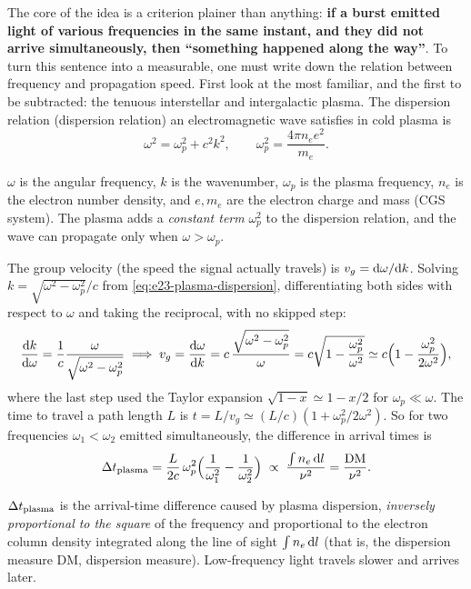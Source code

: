 The core of the idea is a criterion plainer than anything: \textbf{if a burst emitted light of various frequencies in the same instant, and they did not arrive simultaneously, then ``something happened along the way''}. To turn this sentence into a measurable, one must write down the relation between frequency and propagation speed. First look at the most familiar, and the first to be subtracted: the tenuous interstellar and intergalactic plasma. The dispersion relation (dispersion relation) an electromagnetic wave satisfies in cold plasma is
\begin{equation}
  \omega^2=\omega_p^2+c^2k^2,
  \qquad
  \omega_p^2=\frac{4\pi n_e e^2}{m_e}.
  \label{eq:e23-plasma-dispersion}
\end{equation}
\begin{formulaexplain}
\(\omega\) is the angular frequency, \(k\) is the wavenumber, \(\omega_p\) is the plasma frequency, \(n_e\) is the electron number density, and \(e,m_e\) are the electron charge and mass (CGS system). The plasma adds a \emph{constant term} \(\omega_p^2\) to the dispersion relation, and the wave can propagate only when \(\omega>\omega_p\).
\end{formulaexplain}
The group velocity (the speed the signal actually travels) is \(v_g={\rm d}\omega/{\rm d}k\). Solving \(k=\sqrt{\omega^2-\omega_p^2}/c\) from \eqref{eq:e23-plasma-dispersion}, differentiating both sides with respect to \(\omega\) and taking the reciprocal, with no skipped step:
\[
  \frac{{\rm d}k}{{\rm d}\omega}=\frac{1}{c}\frac{\omega}{\sqrt{\omega^2-\omega_p^2}}
  \;\Longrightarrow\;
  v_g=\frac{{\rm d}\omega}{{\rm d}k}=c\,\frac{\sqrt{\omega^2-\omega_p^2}}{\omega}
  =c\sqrt{1-\frac{\omega_p^2}{\omega^2}}
  \simeq c\Bigl(1-\frac{\omega_p^2}{2\omega^2}\Bigr),
\]
where the last step used the Taylor expansion \(\sqrt{1-x}\simeq1-x/2\) for \(\omega_p\ll\omega\). The time to travel a path length \(L\) is \(t=L/v_g\simeq(L/c)(1+\omega_p^2/2\omega^2)\). So for two frequencies \(\omega_1<\omega_2\) emitted simultaneously, the difference in arrival times is
\begin{equation}
  \Delta t_{\rm plasma}
  =\frac{L}{2c}\,\omega_p^2\Bigl(\frac{1}{\omega_1^2}-\frac{1}{\omega_2^2}\Bigr)
  \;\propto\;\frac{\int n_e\,{\rm d}l}{\nu^2}
  =\frac{\rm DM}{\nu^2}.
  \label{eq:e23-dm-delay}
\end{equation}
\begin{formulaexplain}
\(\Delta t_{\rm plasma}\) is the arrival-time difference caused by plasma dispersion, \emph{inversely proportional to the square} of the frequency and proportional to the electron column density integrated along the line of sight \(\int n_e\,{\rm d}l\) (that is, the dispersion measure DM, dispersion measure). Low-frequency light travels slower and arrives later.
\end{formulaexplain}
